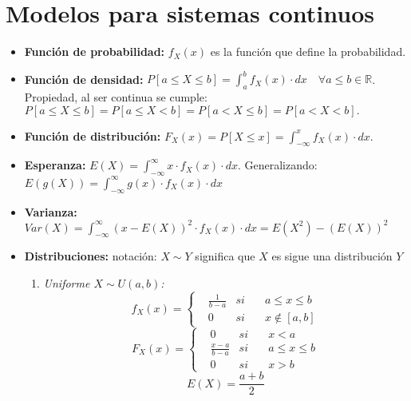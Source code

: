 \documentclass[a4paper, twocolumn, 10pt]{article}
\begin{document}
\section{Modelos para sistemas continuos}

\begin{itemize}
	\item \textbf{Función de probabilidad:} $f_X(x)$ es la función que define la probabilidad.
	\item \textbf{Función de densidad:} $\displaystyle P\left[a \leq X \leq b\right] = \int_{a}^{b}f_X(x)\cdot dx \quad \forall a\leq b \in \mathbb{R}$. Propiedad, al ser continua se cumple: $P\left[a \leq X \leq b\right] = P\left[a \leq X < b\right] = P\left[a < X \leq b\right] = P\left[a < X < b\right].$
	\item \textbf{Función de distribución:} $F_X(x) = P\left[X \leq x\right] = \displaystyle \int_{-\infty}^{x}f_X(x)\cdot dx$.
	\item \textbf{Esperanza:} $E(X) = \displaystyle \int_{-\infty}^{\infty}x\cdot f_X(x)\cdot dx$. Generalizando: $E(g(X)) = \displaystyle \int_{-\infty}^{\infty}g(x)\cdot f_X(x)\cdot dx$
	\item \textbf{Varianza:} $Var(X) = \displaystyle \int_{-\infty}^{\infty}\left(x - E(X)\right)^2 \cdot f_X(x) \cdot dx = E(X^2) -(E(X))^2$
	\item \textbf{Distribuciones:} notación: $X\sim Y$ significa que $X$ es sigue una distribución $Y$
	\begin{enumerate}
		\item \textit{Uniforme $X\sim U(a,b)$:}
		\begin{equation*}
			f_X(x) = \left\lbrace
			\begin{aligned}
			&\frac{1}{b-a} & si \quad& a\leq x\leq b \\
			& 0 & si \quad & x \notin\left[a,b\right]
			\end{aligned} \right.
		\end{equation*}
		\begin{equation*}
			F_X(x) = \left\lbrace
			\begin{aligned}
			& 0 & si \quad & x < a \\
			&\frac{x-a}{b-a} & si \quad& a\leq x\leq b \\
			& 0 & si \quad & x >b
			\end{aligned} \right.
		\end{equation*}
		\begin{equation*}
			E(X) = \frac{a + b}{2}
		\end{equation*}

\end{enumerate}
\end{itemize}
\end{document}
